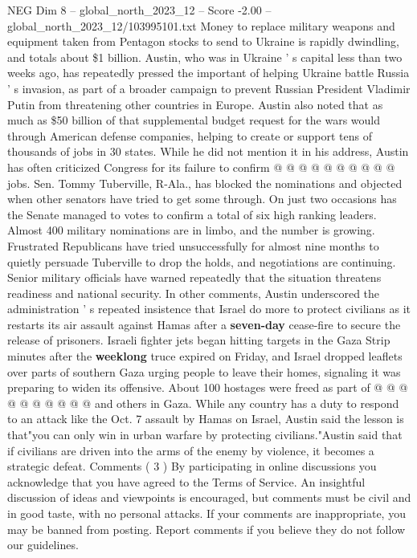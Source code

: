 \begin{textsample}{NEG Dim 8 – global\_north\_2023\_12 – Score -2.00 – global\_north\_2023\_12/103995101.txt}
Money to replace military weapons and equipment taken from Pentagon stocks to send to Ukraine is rapidly dwindling, and totals about \$1 billion.
Austin, who was in Ukraine ' s capital less than two weeks ago, has repeatedly pressed the important of helping Ukraine battle Russia ' s invasion, as part of a broader campaign to prevent Russian President Vladimir Putin from threatening other countries in Europe.
Austin also noted that as much as \$50 billion of that supplemental budget request for the wars would through American defense companies, helping to create or support tens of thousands of jobs in 30 states.
While he did not mention it in his address, Austin has often criticized Congress for its failure to confirm @ @ @ @ @ @ @ @ @ @ jobs.
Sen.
Tommy Tuberville, R-Ala., has blocked the nominations and objected when other senators have tried to get some through.
On just two occasions has the Senate managed to votes to confirm a total of six high ranking leaders.
Almost 400 military nominations are in limbo, and the number is growing.
Frustrated Republicans have tried unsuccessfully for almost nine months to quietly persuade Tuberville to drop the holds, and negotiations are continuing.
Senior military officials have warned repeatedly that the situation threatens readiness and national security.
In other comments, Austin underscored the administration ' s repeated insistence that Israel do more to protect civilians as it restarts its air assault against Hamas after a \textbf{seven-day} cease-fire to secure the release of prisoners.
Israeli fighter jets began hitting targets in the Gaza Strip minutes after the \textbf{weeklong} truce expired on Friday, and Israel dropped leaflets over parts of southern Gaza urging people to leave their homes, signaling it was preparing to widen its offensive.
About 100 hostages were freed as part of @ @ @ @ @ @ @ @ @ @ and others in Gaza.
While any country has a duty to respond to an attack like the Oct. 7 assault by Hamas on Israel, Austin said the lesson is that"you can only win in urban warfare by protecting civilians."Austin said that if civilians are driven into the arms of the enemy by violence, it becomes a strategic defeat.
Comments ( 3 ) By participating in online discussions you acknowledge that you have agreed to the Terms of Service.
An insightful discussion of ideas and viewpoints is encouraged, but comments must be civil and in good taste, with no personal attacks.
If your comments are inappropriate, you may be banned from posting.
Report comments if you believe they do not follow our guidelines.

\end{textsample}
